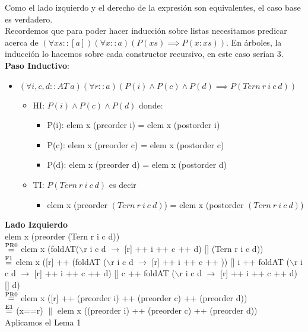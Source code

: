 \documentclass{article}
\begin{document}
Como el lado izquierdo y el derecho de la expresión son equivalentes, el caso base es verdadero. \\
Recordemos que para poder hacer inducción sobre listas necesitamos predicar acerca de $(\forall xs::[a])(\forall x ::a) (P(xs) \implies P(x:xs))$. En árboles, la inducción lo hacemos sobre cada constructor recursivo, en este caso serían 3. \\
\textbf{Paso Inductivo}: 
\begin{itemize}
    \item $(\forall i, c, d:: AT \ a)(\forall r::a)(P(i) \land P(c) \land P(d) \implies P(Tern \ r \ i \ c \ d))$
    \begin{itemize}
        \item HI: $P(i) \land P(c) \land P(d)$ donde: 
        \begin{itemize}
            \item P(i): elem x (preorder i) = elem x (postorder i)
            \item P(c): elem x (preorder c) = elem x (postorder c)
            \item P(d): elem x (preorder d) = elem x (postorder d)
        \end{itemize}
        \item TI: $P(Tern \ r \ i \ c \ d)$ es decir
        \begin{itemize}
        \item elem x (preorder $(Tern \ r \ i \ c \ d)$) = elem x (postorder $(Tern \ r \ i \ c \ d)$)
        \end{itemize}
    \end{itemize}
\end{itemize}
\textbf{Lado Izquierdo} \\
elem x (preorder (Tern r i c d)) \\ 
$\stackrel{\text{PR0}}{=}$ elem x (foldAT($\backslash$r i c d $\rightarrow$ [r] ++ i ++ c ++ d) [] (Tern r i c d)) \\ 
$\stackrel{\text{F1}}{=}$ elem x ([r] ++ (foldAT ($\backslash$r i c d $\rightarrow$ [r] ++ i ++ c ++ )) [] i ++ foldAT ($\backslash$r i c d $\rightarrow$ [r] ++ i ++ c ++ d) [] c ++ foldAT ($\backslash$r i c d $\rightarrow$ [r] ++ i ++ c ++ d) [] d) \\ 
$\stackrel{\text{PR0}}{=}$ elem x ([r] ++ (preorder i) ++ (preorder c) ++ (preorder d)) \\
$\stackrel{\text{E1}}{=}$ (x==r) $\|$ elem x ((preorder i) ++ (preorder c) ++ (preorder d)) \\
Aplicamos el Lema 1 \\
\end{document}
